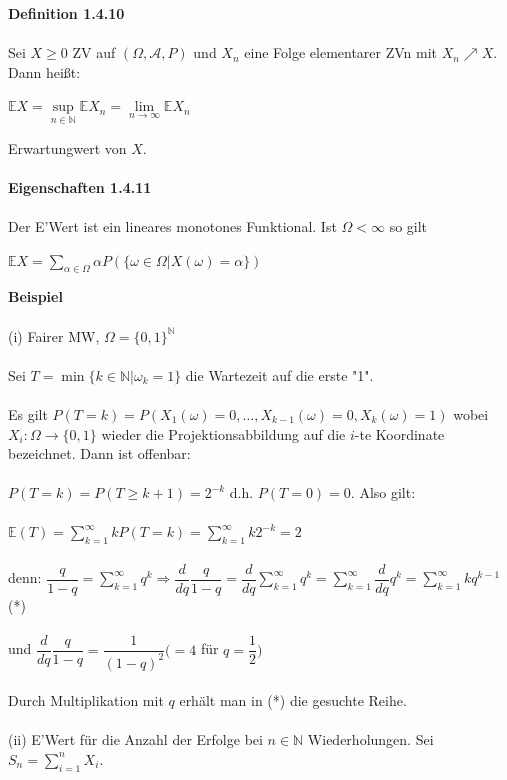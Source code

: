 \documentclass[10pt,a4paper]{report}
\numberwithin{equation}{section}
\numberwithin{figure}{section}
\theoremstyle{plain}
\theoremstyle{definition}
\theoremstyle{plain}
\theoremstyle{definition}
\theoremstyle{remark}
\theoremstyle{plain}
\begin{document}
\textbf{Definition 1.4.10}\\\\
Sei $X\geq 0$ ZV auf $(\Omega,\mathcal{A},P)$ und $X_n$ eine Folge elementarer ZVn mit $X_n\nearrow X$. Dann heißt:
\begin{center}
$\mathbb{E}X=\sup\limits_{n\in \mathbb{N}}\mathbb{E}X_n=\lim\limits_{n \to \infty}\mathbb{E}X_n$
\end{center}
Erwartungwert von $X$.\\\\
\textbf{Eigenschaften 1.4.11}\\\\
Der E'Wert ist ein lineares monotones Funktional. Ist $\Omega<\infty$ so gilt
\begin{center}
$\mathbb{E}X=\sum\limits_{\alpha \in \Omega}\alpha P(\{\omega \in \Omega|X(\omega)=\alpha\})$
\end{center}
\textbf{Beispiel}\\\\
(i) Fairer MW, $\Omega=\{0,1\}^{\mathbb{N}}$\\\\
Sei $T=\min\{k\in \mathbb{N}|\omega_k=1\}$ die Wartezeit auf die erste "1".\\\\
Es gilt $P(T=k)=P(X_1(\omega)=0,\dots,X_{k-1}(\omega)=0,X_k(\omega)=1)$ wobei $X_i:\Omega \to \{0,1\}$ wieder die Projektionsabbildung auf die $i$-te Koordinate bezeichnet. Dann ist offenbar:\\\\
$P(T=k)=P(T\geq k+1)=2^{-k}$ d.h. $P(T=0)=0$. Also gilt:\\\\
$\mathbb{E}(T)=\sum\limits_{k=1}^\infty kP(T=k)=\sum\limits_{k=1}^\infty k2^{-k}=2$\\\\
denn: $\dfrac{q}{1-q}=\sum\limits_{k=1}^\infty q^k \Rightarrow \dfrac{d}{dq}\dfrac{q}{1-q}=\dfrac{d}{dq}\sum\limits_{k=1}^\infty q^k=\sum\limits_{k=1}^\infty \dfrac{d}{dq} q^k=\sum\limits_{k=1}^\infty kq^{k-1}$ (*)\\\\
und $\dfrac{d}{dq}\dfrac{q}{1-q}=\dfrac{1}{(1-q)^2} (=4$ für $q=\dfrac{1}{2})$\\\\
Durch Multiplikation mit $q$ erhält man in (*) die gesuchte Reihe.\\\\
(ii) E'Wert für die Anzahl der Erfolge bei $n \in \mathbb{N}$ Wiederholungen. Sei $S_n=\sum\limits_{i=1}^nX_i$.\\\\
\end{document}
